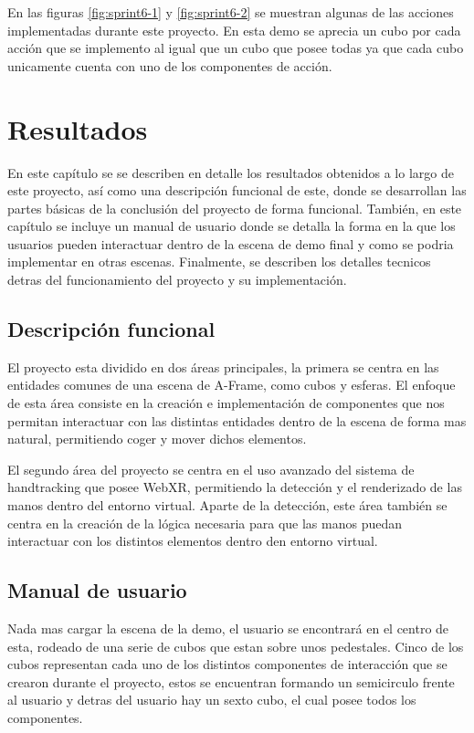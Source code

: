 \documentclass[a4paper, 12pt]{book}
\begin{document}
En las figuras \ref{fig:sprint6-1} y \ref{fig:sprint6-2} se muestran algunas de las acciones implementadas durante este proyecto. En esta demo se aprecia un cubo por cada acción que se implemento al igual que un cubo que posee todas ya que cada cubo unicamente cuenta con uno de los componentes de acción.

\cleardoublepage
\chapter{Resultados}
\label{chap:resultados}
En este capítulo se se describen en detalle los resultados obtenidos a lo largo de este proyecto, así como una descripción funcional de este, donde se desarrollan las partes básicas de la conclusión del proyecto de forma funcional. También, en este capítulo se incluye un manual de usuario donde se detalla la forma en la que los usuarios pueden interactuar dentro de la escena de demo final y como se podria implementar en otras escenas. Finalmente, se describen los detalles tecnicos detras del funcionamiento del proyecto y su implementación.

\section{Descripción funcional}
\label{sec:descripcion-funcional}
El proyecto esta dividido en dos áreas principales, la primera se centra en las entidades comunes de una escena de A-Frame, como cubos y esferas. El enfoque de esta área consiste en la creación e implementación de componentes que nos permitan interactuar con las distintas entidades dentro de la escena de forma mas natural, permitiendo coger y mover dichos elementos.

El segundo área del proyecto se centra en el uso avanzado del sistema de handtracking que posee WebXR, permitiendo la detección y el renderizado de las manos dentro del entorno virtual. Aparte de la detección, este área también se centra en la creación de la lógica necesaria para que las manos puedan interactuar con los distintos elementos dentro den entorno virtual.
\section{Manual de usuario}
\label{sec:manual-usuario}
Nada mas cargar la escena de la demo, el usuario se encontrará en el centro de esta, rodeado de una serie de cubos que estan sobre unos pedestales. Cinco de los cubos representan cada uno de los distintos componentes de interacción que se crearon durante el proyecto, estos se encuentran formando un semicirculo frente al usuario y detras del usuario hay un sexto cubo, el cual posee todos los componentes.
\end{document}
